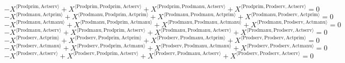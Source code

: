 \begin{equation}
-{X}^{\langle \mathrm{Prodprim},\mathrm{Actserv}\rangle} + {X}^{\langle \mathrm{Prodprim},\mathrm{Prodprim},\mathrm{Actserv}\rangle} + {X}^{\langle \mathrm{Prodprim},\mathrm{Prodmanu},\mathrm{Actserv}\rangle} + {X}^{\langle \mathrm{Prodprim},\mathrm{Prodserv},\mathrm{Actserv}\rangle} = 0
\end{equation}
\begin{equation}
-{X}^{\langle \mathrm{Prodmanu},\mathrm{Actprim}\rangle} + {X}^{\langle \mathrm{Prodmanu},\mathrm{Prodprim},\mathrm{Actprim}\rangle} + {X}^{\langle \mathrm{Prodmanu},\mathrm{Prodmanu},\mathrm{Actprim}\rangle} + {X}^{\langle \mathrm{Prodmanu},\mathrm{Prodserv},\mathrm{Actprim}\rangle} = 0
\end{equation}
\begin{equation}
-{X}^{\langle \mathrm{Prodmanu},\mathrm{Actmanu}\rangle} + {X}^{\langle \mathrm{Prodmanu},\mathrm{Prodprim},\mathrm{Actmanu}\rangle} + {X}^{\langle \mathrm{Prodmanu},\mathrm{Prodmanu},\mathrm{Actmanu}\rangle} + {X}^{\langle \mathrm{Prodmanu},\mathrm{Prodserv},\mathrm{Actmanu}\rangle} = 0
\end{equation}
\begin{equation}
-{X}^{\langle \mathrm{Prodmanu},\mathrm{Actserv}\rangle} + {X}^{\langle \mathrm{Prodmanu},\mathrm{Prodprim},\mathrm{Actserv}\rangle} + {X}^{\langle \mathrm{Prodmanu},\mathrm{Prodmanu},\mathrm{Actserv}\rangle} + {X}^{\langle \mathrm{Prodmanu},\mathrm{Prodserv},\mathrm{Actserv}\rangle} = 0
\end{equation}
\begin{equation}
-{X}^{\langle \mathrm{Prodserv},\mathrm{Actprim}\rangle} + {X}^{\langle \mathrm{Prodserv},\mathrm{Prodprim},\mathrm{Actprim}\rangle} + {X}^{\langle \mathrm{Prodserv},\mathrm{Prodmanu},\mathrm{Actprim}\rangle} + {X}^{\langle \mathrm{Prodserv},\mathrm{Prodserv},\mathrm{Actprim}\rangle} = 0
\end{equation}
\begin{equation}
-{X}^{\langle \mathrm{Prodserv},\mathrm{Actmanu}\rangle} + {X}^{\langle \mathrm{Prodserv},\mathrm{Prodprim},\mathrm{Actmanu}\rangle} + {X}^{\langle \mathrm{Prodserv},\mathrm{Prodmanu},\mathrm{Actmanu}\rangle} + {X}^{\langle \mathrm{Prodserv},\mathrm{Prodserv},\mathrm{Actmanu}\rangle} = 0
\end{equation}
\begin{equation}
-{X}^{\langle \mathrm{Prodserv},\mathrm{Actserv}\rangle} + {X}^{\langle \mathrm{Prodserv},\mathrm{Prodprim},\mathrm{Actserv}\rangle} + {X}^{\langle \mathrm{Prodserv},\mathrm{Prodmanu},\mathrm{Actserv}\rangle} + {X}^{\langle \mathrm{Prodserv},\mathrm{Prodserv},\mathrm{Actserv}\rangle} = 0
\end{equation}
